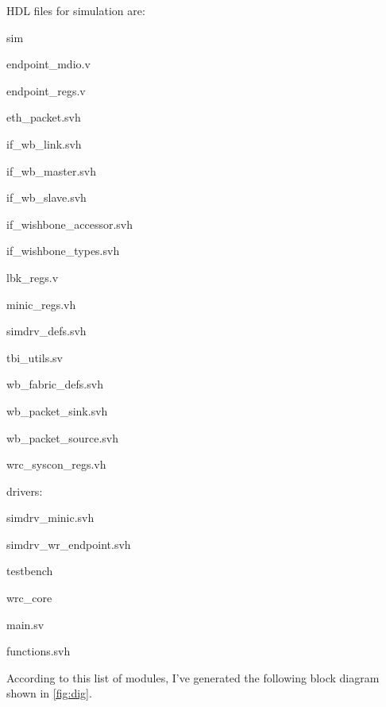 \newpage 

\noindent HDL files for simulation are:

\begin{dig}
\item sim
    \begin{dig}
    \item endpoint\_mdio.v
    \item endpoint\_regs.v
    \item eth\_packet.svh
    \item if\_wb\_link.svh
    \item if\_wb\_master.svh
    \item if\_wb\_slave.svh
    \item if\_wishbone\_accessor.svh
    \item if\_wishbone\_types.svh
    \item lbk\_regs.v
    \item minic\_regs.vh
    \item simdrv\_defs.svh
    \item tbi\_utils.sv
    \item wb\_fabric\_defs.svh
    \item wb\_packet\_sink.svh
    \item wb\_packet\_source.svh
    \item wrc\_syscon\_regs.vh
    \item drivers:
        \begin{dig}
        \item simdrv\_minic.svh
        \item simdrv\_wr\_endpoint.svh 
        \end{dig}
    \end{dig}
\item testbench
    \begin{dig}
    \item wrc\_core
        \begin{dig}
        \item main.sv 
        \item functions.svh 
        \end{dig}
    \end{dig}
\end{dig}

\vspace{5mm}

\noindent According to this list of modules, I've generated the following block diagram shown in \ref{fig:dig}.

\vspace{5mm}


